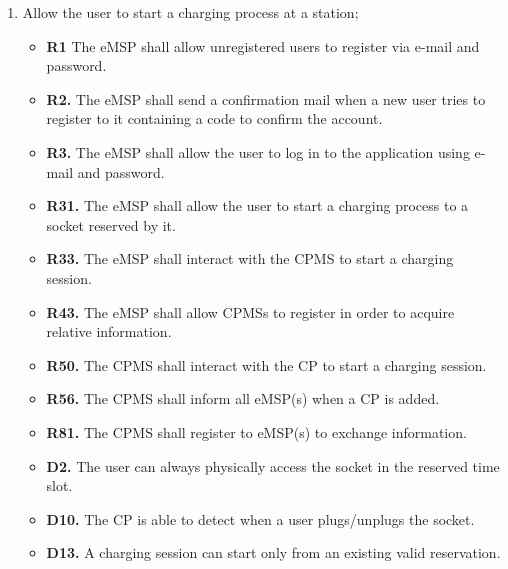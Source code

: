 \documentclass{Configuration_Files/PoliMi3i_thesis}
\begin{document}
\begin{enumerate}[label=\textbf{G\arabic*}]
    \item Allow the user to start a charging process at a station;
        \begin{itemize}
            \item \textbf{R1} The eMSP shall allow unregistered users to register via e-mail and password.
            \item \textbf{R2.} The eMSP shall send a confirmation mail when a new user tries to register to it containing a code to confirm the account.
            \item \textbf{R3.} The eMSP shall allow the user to log in to the application using e-mail and password. 
            \item \textbf{R31.} The eMSP shall allow the user to start a charging process to a socket reserved by it.
            \item \textbf{R33.} The eMSP shall interact with the CPMS to start a charging session.
            \item \textbf{R43.} The eMSP shall allow CPMSs to register in order to acquire relative information.
            \item \textbf{R50.} The CPMS shall interact with the CP to start a charging session.
            \item \textbf{R56.} The CPMS shall inform all eMSP(s) when a CP is added.
            \item \textbf{R81.} The CPMS shall register to eMSP(s) to exchange information.
            \item \textbf{D2.} The user can always physically access the socket in the reserved time slot.
            \item \textbf{D10.} The CP is able to detect when a user plugs/unplugs the socket.
            \item \textbf{D13.} A charging session can start only from an existing valid reservation.
        \end{itemize}


\end{enumerate}
\end{document}
